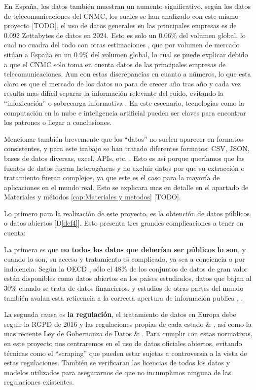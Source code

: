 En España, los datos también muestran un aumento significativo, según los datos de telecomunicaciones del CNMC, los cuales se han analizado con este mismo proyecto \citep{DatosGeneralesCNMC} [TODO], el uso de datos generales en las principales empresas es de 0.092 Zettabytes de datos en 2024.
Esto es solo un 0.06\% del volumen global, lo cual no cuadra del todo con otras estimaciones \citep{DatosMercadosEspanna}, que por volumen de mercado sitúan a España en un 0.9\% del volumen global, lo cual se puede explicar debido a que el CNMC solo toma en cuenta datos de las principales empresas de telecomunicaciones. 
Aun con estas discrepancias en cuanto a números, lo que esta claro es que el mercado de los datos no para de crecer año tras año y cada vez resulta mas difícil separar la información relevante del ruido, evitando la ``infoxicación'' o sobrecarga informativa \citep{Infoxicacion}. En este escenario, tecnologías como la computación en la nube e inteligencia artificial pueden ser claves para encontrar los patrones o llegar a conclusiones.

Mencionar también brevemente que los ``datos'' no suelen aparecer en formatos consistentes, y para este trabajo se han tratado diferentes formatos: CSV, JSON, bases de datos diversas, excel, APIs, etc. \citep{khan2019fileFormats}. Esto es así porque queríamos que las fuentes de datos fueran heterogéneas y no excluir datos por que su extracción o tratamiento fueran complejos, ya que este es el caso para la mayoría de aplicaciones en el mundo real. Esto se explicara mas en detalle en el apartado de Materiales y métodos \ref{cap:Materiales y metodos} [TODO].

Lo primero para la realización de este proyecto, es la obtención de datos públicos, o datos abiertos [D\ref{def4}]. Esto presenta tres grandes complicaciones a tener en cuenta:

La primera es que \textbf{no todos los datos que deberían ser públicos lo son}, y cuando lo son, su acceso y tratamiento es complicado, ya sea a conciencia o por indolencia. Según la OECD \citep{OECD2023openData}, sólo el 48\% de los conjuntos de datos de gran valor están disponibles como datos abiertos en los países estudiados, datos que bajan al 30\% cuando se trata de datos financieros. y estudios de otras partes del mundo también avalan esta reticencia a la correcta apertura de información publica \citep{TransparenciaEcuador}, \citep{TransparenciaMexico}.

La segunda causa es \textbf{la regulación}, el tratamiento de datos en Europa debe seguir la RGPD de 2016 y las regulaciones propias de cada estado \citep{LicenciasLibres2017Datos} \& \citep{webRGPD2016Europa}, así como la mas reciente Ley de Gobernanza de Datos \citep{webLGD2023Europa} \& \citep{DatosAbiertos2022Cloud}. Para cumplir con estas normativas, en este proyecto nos centraremos en el uso de datos oficiales abiertos, evitando técnicas como el ``scraping'' que pueden estar sujetas a controversia a la vista de estas regulaciones. También se verificaran las licencias de todos los datos y modelos utilizados para asegurarnos de que no incumplimos ninguna de las regulaciones existentes.


